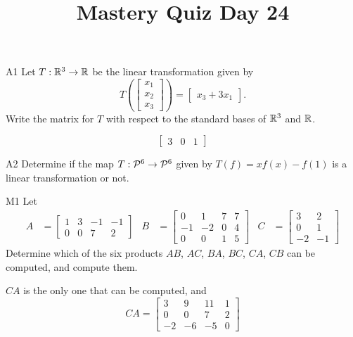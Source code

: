 \documentclass{sbgLAquiz}
\title{Mastery Quiz Day 24 }
\begin{document}
\begin{problem}{A1}
Let $T: \IR^3 \rightarrow \IR$ be the linear transformation given by $$T\left(\begin{bmatrix} x_1 \\ x_2 \\ x_3  \end{bmatrix} \right) = \begin{bmatrix} x_3+3x_1 \end{bmatrix}.$$ Write the matrix for $T$ with respect to the standard bases of $\IR^3$ and $\IR$.
\end{problem}
\begin{solution}
$$\begin{bmatrix} 3 & 0 & 1 \end{bmatrix}$$
\end{solution}
\begin{problem}{A2}
Determine if the map $T: \P^6  \rightarrow \P^6$ given by $T(f) = xf(x)-f(1)$ is a linear transformation or not.
\end{problem}

\begin{extract}\newpage\end{extract}
\begin{problem}{M1}
Let 
\begin{align*}
A &= \begin{bmatrix} 1 & 3 & -1 & -1 \\ 0 & 0 & 7 & 2 \end{bmatrix} & B &= \begin{bmatrix} 0 & 1 & 7 & 7 \\ -1 & -2 & 0 & 4 \\ 0 & 0 & 1 & 5 \end{bmatrix} & C&=\begin{bmatrix} 3 & 2 \\ 0 & 1 \\ -2 & -1 \end{bmatrix}
\end{align*}
Determine which of the six products $AB$, $AC$, $BA$, $BC$, $CA$, $CB$ can be computed, and compute them.
\end{problem}
\begin{solution}
$CA$ is the only one that can be computed, and 
$$CA = \begin{bmatrix} 3 & 9 & 11 & 1 \\ 0 & 0 & 7 & 2 \\ -2 & - 6 & -5 & 0 \end{bmatrix}$$
\end{solution}
\end{document}

